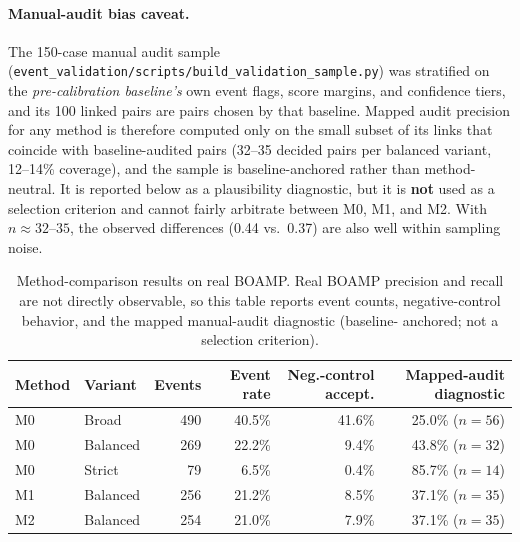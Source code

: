 \documentclass[12pt, a4paper]{article}
\begin{document}
\paragraph{Manual-audit bias caveat.}
The 150-case manual audit sample
(\texttt{event\_validation/scripts/build\_validation\_sample.py}) was
stratified on the \emph{pre-calibration baseline's} own event flags, score
margins, and confidence tiers, and its 100 linked pairs are pairs chosen by
that baseline. Mapped audit precision for any method is therefore computed
only on the small subset of its links that coincide with baseline-audited
pairs (32--35 decided pairs per balanced variant, 12--14\% coverage), and the
sample is baseline-anchored rather than method-neutral. It is reported below
as a plausibility diagnostic, but it is \textbf{not} used as a selection
criterion and cannot fairly arbitrate between M0, M1, and M2. With $n
\approx 32$--$35$, the observed differences (0.44 vs.\ 0.37) are also well
within sampling noise.

\begin{table}[H]
\centering
\caption{Method-comparison results on real BOAMP. Real BOAMP precision and
recall are not directly observable, so this table reports event counts,
negative-control behavior, and the mapped manual-audit diagnostic (baseline-%
anchored; not a selection criterion).}
\label{tab:method_comparison_real}
\small
\begin{tabular}{llrrrr}
\toprule
Method & Variant & Events & Event rate & Neg.-control accept. & Mapped-audit diagnostic \\
\midrule
M0 & Broad    & 490 & 40.5\% & 41.6\% & 25.0\% ($n{=}56$) \\
M0 & Balanced & 269 & 22.2\% &  9.4\% & 43.8\% ($n{=}32$) \\
M0 & Strict   &  79 &  6.5\% &  0.4\% & 85.7\% ($n{=}14$) \\
M1 & Balanced & 256 & 21.2\% &  8.5\% & 37.1\% ($n{=}35$) \\
M2 & Balanced & 254 & 21.0\% &  7.9\% & 37.1\% ($n{=}35$) \\
\bottomrule
\end{tabular}
\end{table}
\end{document}
